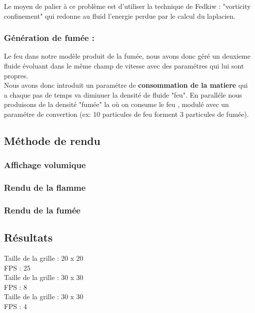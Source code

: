 \documentclass[a4paper,10pt]{article}
\begin{document}
Le moyen de palier à ce problème est d'utiliser la technique de Fedkiw : "vorticity confinement" qui redonne au fluid l'energie perdue par le calcul du laplacien.

\subsubsection{Génération de fumée :}
Le feu dans notre modèle produit de la fumée, nous avons donc géré un deuxieme fluide évoluant dans le même champ de vitesse avec des paramétres qui lui sont propres.\\

Nous avons donc introduit un paramétre de \textbf{consommation de la matiere} qui a chaque pas de temps va diminuer la densité de fluide "feu". En paralléle nous produisons de la densité "fumée" la où on consume le feu , modulé avec un paramétre de convertion (ex: 10 particules de feu forment 3 particules de fumée).


\subsection{Méthode de rendu}
\subsubsection{Affichage volumique}
\subsubsection{Rendu de la flamme}
\subsubsection{Rendu de la fumée}


\subsection{Résultats}

Taille de la grille : 20 x 20 \\
FPS : 25\\

Taille de la grille : 30 x 30 \\
FPS : 8\\

Taille de la grille : 30 x 30 \\
FPS : 4\\

\end{document}
